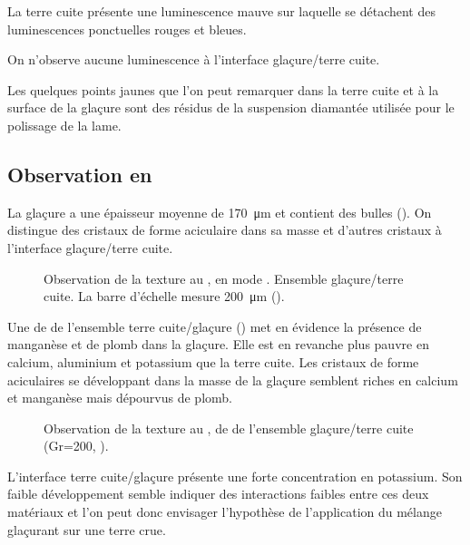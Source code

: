 La terre cuite présente une luminescence mauve sur laquelle se 
détachent des luminescences ponctuelles rouges et bleues.

On n'observe aucune luminescence à l'interface glaçure/terre cuite.

Les quelques points jaunes que l'on peut remarquer dans la terre cuite 
et à la surface de la glaçure sont des résidus de la suspension 
diamantée utilisée pour le polissage de la lame.

\subsection{Observation en \MEB[ie]}
La glaçure a une épaisseur moyenne de \SI{170}{\um} et contient 
des bulles (). On distingue des cristaux de 
forme aciculaire dans sa masse et d'autres cristaux à l'interface 
glaçure/terre cuite.

\begin{figure}[htb]
  \caption[\ -- Observation de la texture au \MEB, 
           en mode \ERD. Ensemble glaçure/terre cuite]
          {\legendeC
           Observation de la texture au \MEB, en mode \ERD. 
           Ensemble glaçure/terre cuite. La barre d'échelle mesure 
           \SI{200}{\um} ().}
  \label{MEB:6530_img}
\end{figure}

Une \carto de \RX de l'ensemble terre cuite/glaçure () met en évidence la présence de manganèse et de plomb dans la glaçure. Elle est en revanche plus pauvre en calcium, aluminium et potassium que la terre cuite. Les cristaux de forme aciculaires se développant dans la masse de la glaçure semblent riches en calcium et manganèse mais dépourvus de plomb.

\begin{figure}[htb]
  \caption[\ -- Observation de la texture au \MEB, \carto de \RX de l'ensemble glaçure/terre cuite]
          {\legendeC
           Observation de la texture au \MEB, \carto de \RX de l'ensemble glaçure/terre cuite (Gr=200, ).}
  \label{MEB:6530_carto_tcgla}
\end{figure}

L'interface terre cuite/glaçure présente une forte concentration en 
potassium. Son faible développement semble indiquer des interactions 
faibles entre ces deux matériaux et l'on peut donc envisager 
l'hypothèse de l'application du mélange glaçurant sur une terre crue.

